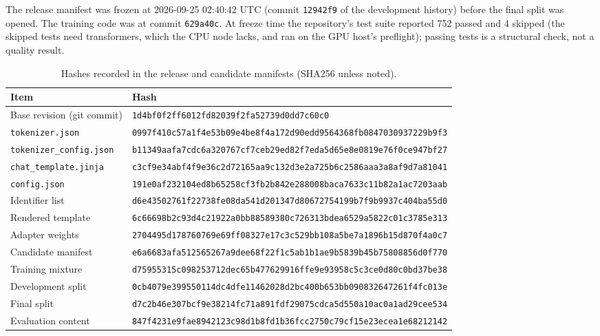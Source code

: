 The release manifest was frozen at 2026-09-25 02:40:42 UTC (commit \texttt{12942f9} of the
development history) before the final split was opened. The training code was at commit
\texttt{629a40c}. At freeze time the repository's test suite reported 752 passed and 4
skipped (the skipped tests need transformers, which the CPU node lacks, and ran on the GPU
host's preflight); passing tests is a structural check, not a quality result.

\begin{table}[h]
\centering
\scriptsize
\caption{Hashes recorded in the release and candidate manifests (SHA256 unless noted).}
\label{tab:hashes}
\begin{tabular}{@{}ll@{}}
\toprule
Item & Hash \\
\midrule
Base revision (git commit) & \texttt{1d4bf0f2ff6012fd82039f2fa52739d0dd7c60c0} \\
\texttt{tokenizer.json} & \texttt{0997f410c57a1f4e53b09e4be8f4a172d90edd9564368fb0847030937229b9f3} \\
\texttt{tokenizer\_config.json} & \texttt{b11349aafa7cdc6a320767cf7ceb29ed82f7eda5d65e8e0819e76f0ce947bf27} \\
\texttt{chat\_template.jinja} & \texttt{c3cf9e34abf4f9e36c2d72165aa9c132d3e2a725b6c2586aaa3a8af9d7a81041} \\
\texttt{config.json} & \texttt{191e0af232104ed8b65258cf3fb2b842e288008baca7633c11b82a1ac7203aab} \\
Identifier list & \texttt{d6e43502761f22738fe08da541d201347d80672754199b7f9b9937c404ba55d0} \\
Rendered template & \texttt{6c66698b2c93d4c21922a0bb88589380c726313bdea6529a5822c01c3785e313} \\
Adapter weights & \texttt{2704495d178760769e69ff08327e17c3c529bb108a5be7a1896b15d870f4a0c7} \\
Candidate manifest & \texttt{e6a6683afa512565267a9dee68f22f1c5ab1b1ae9b5839b45b75808856d0f770} \\
Training mixture & \texttt{d75955315c098253712dec65b477629916ffe9e93958c5c3ce0d80c0bd37be38} \\
Development split & \texttt{0cb4079e399550114dc4dfe11462028d2bc400b653bb090832647261f4fc013e} \\
Final split & \texttt{d7c2b46e307bcf9e38214fc71a891fdf29075cdca5d550a10ac0a1ad29cee534} \\
Evaluation content & \texttt{847f4231e9fae8942123c98d1b8fd1b36fcc2750c79cf15e23ecea1e68212142} \\
\bottomrule
\end{tabular}
\end{table}
